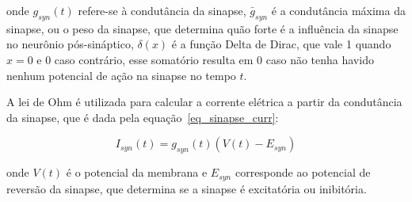 onde $g_{syn}(t)$ refere-se à condutância da sinapse, $\bar{g}_{syn}$ é a condutância máxima da sinapse, ou o peso da sinapse, que
determina quão forte é a influência da sinapse no neurônio pós-sináptico, $\delta(x)$ é a função Delta de Dirac, que vale 1 quando
$x=0$ e 0 caso contrário, esse somatório resulta em 0 caso não tenha havido nenhum potencial de ação na sinapse no tempo $t$.

A lei de Ohm é utilizada para calcular a corrente elétrica a partir da condutância da sinapse, que é dada pela
equação~\ref{eq_sinapse_curr}:

\begin{equation}
\label{eq_sinapse_curr}
I_{syn}(t)=g_{syn}(t)(V(t)-E_{syn})
\end{equation}

onde $V(t)$ é o potencial da membrana e $E_{syn}$ corresponde ao potencial de reversão da sinapse, que determina se a sinapse é
excitatória ou inibitória.

